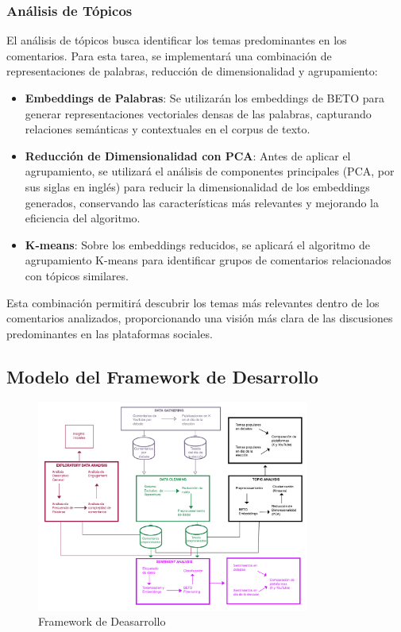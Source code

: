 \documentclass[10pt, a4paper]{article}
\begin{document}
	
	
	\subsubsection{Análisis de Tópicos}
	
	El análisis de tópicos busca identificar los temas predominantes en los comentarios. Para esta tarea, se implementará una combinación de representaciones de palabras, reducción de dimensionalidad y agrupamiento:
	
	\begin{itemize}
		\item \textbf{Embeddings de Palabras}: Se utilizarán los embeddings de BETO para generar representaciones vectoriales densas de las palabras, capturando relaciones semánticas y contextuales en el corpus de texto.
		\item \textbf{Reducción de Dimensionalidad con PCA}: Antes de aplicar el agrupamiento, se utilizará el análisis de componentes principales (PCA, por sus siglas en inglés) para reducir la dimensionalidad de los embeddings generados, conservando las características más relevantes y mejorando la eficiencia del algoritmo.
		\item \textbf{K-means}: Sobre los embeddings reducidos, se aplicará el algoritmo de agrupamiento K-means para identificar grupos de comentarios relacionados con tópicos similares.
	\end{itemize}
	
	Esta combinación permitirá descubrir los temas más relevantes dentro de los comentarios analizados, proporcionando una visión más clara de las discusiones predominantes en las plataformas sociales.
	
	\subsection{Modelo del Framework de Desarrollo}
	
	\begin{figure}[h!] %
		\centering
		\includegraphics[width=0.8\textwidth]{diagrama.pdf} %
		\caption{Framework de Deasarrollo} %
		\label{fig:framework} %
	\end{figure}
	
\end{document}
